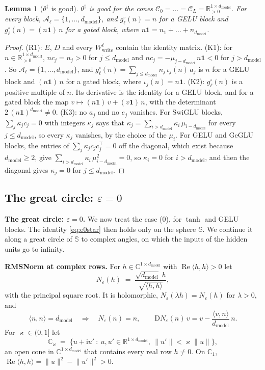 \documentclass[10pt]{article}
\newtheorem{lemma}[theorem]{Lemma}
\theoremstyle{definition}
\theoremstyle{remark}
\newcommand{\R}{\mathbb{R}}
\newcommand{\Wwrite}{W_{\mathrm{write}}}
\newcommand{\dm}{d_{\mathrm{model}}}
\newcommand{\Der}{\mathrm{D}}
\newcommand{\norm}[1]{\lVert #1\rVert}
\newcommand{\para}[1]{\smallskip\noindent\textbf{#1}\hspace{0.5em}}
\begin{document}
\begin{lemma}[$\theta^\dagger$ is good]\label{lem:gtstar}
$\theta^\dagger$ is good for the cones $\mathcal C_0 = \dots = \mathcal C_L = \R^{1\times\dm}_{>0}$. For every block, $\mathcal A_\ell = \{1, \dots, \dm\}$, and $g^\circ_\ell(n) = n$ for a GELU block and $g^\circ_\ell(n) = (n\mathbf 1)\,n$ for a gated block, where $n\mathbf 1 = n_1 + \dots + n_{\dm}$.
\end{lemma}

\begin{proof}
(R1): $E$, $D$ and every $\Wwrite^{\ell}$ contain the identity matrix. (K1): for $n \in \R^{1\times\dm}_{>0}$, $nc_j = n_j > 0$ for $j \le \dm$ and $nc_j = -\mu_{j-\dm}\,n\mathbf 1 < 0$ for $j > \dm$. So $\mathcal A_\ell = \{1, \dots, \dm\}$, and $g^\circ_\ell(n) = \sum_{j\le\dm}n_j\,\iota_j(n)\,a_j$ is $n$ for a GELU block and $(n\mathbf 1)\,n$ for a gated block, where $\iota_j(n) = n\mathbf 1$. (K2): $g^\circ_\ell(n)$ is a positive multiple of $n$. Its derivative is the identity for a GELU block, and for a gated block the map $v \mapsto (n\mathbf 1)\,v + (v\mathbf 1)\,n$, with the determinant $2\,(n\mathbf 1)^{\dm} \neq 0$. (K3): no $a_j$ and no $e_j$ vanishes. For SwiGLU blocks, $\sum_j\kappa_jc_j = 0$ with integers $\kappa_j$ says that $\kappa_j = \sum_{i>\dm}\kappa_i\,\mu_{i-\dm}$ for every $j \le \dm$, so every $\kappa_j$ vanishes, by the choice of the $\mu_i$. For GELU and GeGLU blocks, the entries of $\sum_j\kappa_jc_jc_j^\top = 0$ off the diagonal, which exist because $\dm \ge 2$, give $\sum_{i>\dm}\kappa_i\,\mu_{i-\dm}^2 = 0$, so $\kappa_i = 0$ for $i > \dm$, and then the diagonal gives $\kappa_j = 0$ for $j \le \dm$.
\end{proof}

\subsection{The great circle: \texorpdfstring{$\varepsilon = 0$}{no regularization}}\label{app:circle}

\para{The great circle: $\varepsilon = 0$.} We now treat the case (0), for $\tanh$ and GELU blocks. The identity \eqref{eq:e0star} then holds only on the sphere $\mathbb S$. We continue it along a great circle of $\mathbb S$ to complex angles, on which the inputs of the hidden units go to infinity.

\para{RMSNorm at complex rows.} For $h \in \mathbb C^{1\times\dm}$ with $\operatorname{Re}\langle h, h\rangle > 0$ let
\[
N_\varepsilon(h) \;=\; \frac{\sqrt{\dm}\;h}{\sqrt{\langle h, h\rangle}},
\]
with the principal square root. It is holomorphic, $N_\varepsilon(\lambda h) = N_\varepsilon(h)$ for $\lambda > 0$, and
\begin{equation}\label{eq:e0DN}
\langle n, n\rangle = \dm \quad\Longrightarrow\quad N_\varepsilon(n) = n, \qquad \Der N_\varepsilon(n)\,v = v - \frac{\langle v, n\rangle}{\dm}\,n .
\end{equation}
For $\varkappa \in (0, 1]$ let
\[
\mathbb C_\varkappa \;=\; \big\{u + \mathrm iu' \ :\ u, u' \in \R^{1\times\dm},\ \norm{u'} < \varkappa\norm{u}\big\},
\]
an open cone in $\mathbb C^{1\times\dm}$ that contains every real row $h \neq 0$. On $\mathbb C_1$, $\operatorname{Re}\langle h, h\rangle = \norm{u}^2 - \norm{u'}^2 > 0$.
\end{document}
